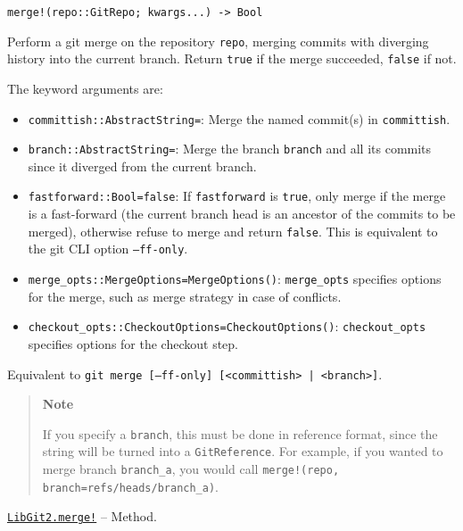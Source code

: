 \begin{adjustwidth}{2em}{0pt}


\begin{verbatim}
merge!(repo::GitRepo; kwargs...) -> Bool
\end{verbatim}

Perform a git merge on the repository \texttt{repo}, merging commits with diverging history into the current branch. Return \texttt{true} if the merge succeeded, \texttt{false} if not.

The keyword arguments are:

\begin{itemize}
\item \texttt{committish::AbstractString={\textquotedbl}{\textquotedbl}}: Merge the named commit(s) in \texttt{committish}.


\item \texttt{branch::AbstractString={\textquotedbl}{\textquotedbl}}: Merge the branch \texttt{branch} and all its commits since it diverged from the current branch.


\item \texttt{fastforward::Bool=false}: If \texttt{fastforward} is \texttt{true}, only merge if the merge is a fast-forward (the current branch head is an ancestor of the commits to be merged), otherwise refuse to merge and return \texttt{false}. This is equivalent to the git CLI option \texttt{--ff-only}.


\item \texttt{merge\_opts::MergeOptions=MergeOptions()}: \texttt{merge\_opts} specifies options for the merge, such as merge strategy in case of conflicts.


\item \texttt{checkout\_opts::CheckoutOptions=CheckoutOptions()}: \texttt{checkout\_opts} specifies options for the checkout step.

\end{itemize}
Equivalent to \texttt{git merge [--ff-only] [<committish> | <branch>]}.

\begin{quote}
\textbf{Note}

If you specify a \texttt{branch}, this must be done in reference format, since the string will be turned into a \texttt{GitReference}. For example, if you wanted to merge branch \texttt{branch\_a}, you would call \texttt{merge!(repo, branch={\textquotedbl}refs/heads/branch\_a{\textquotedbl})}.

\end{quote}


\end{adjustwidth}
\hypertarget{5698103776559177857}{}
\hyperlink{5698103776559177857}{\texttt{LibGit2.merge!}}  -- {Method.}

